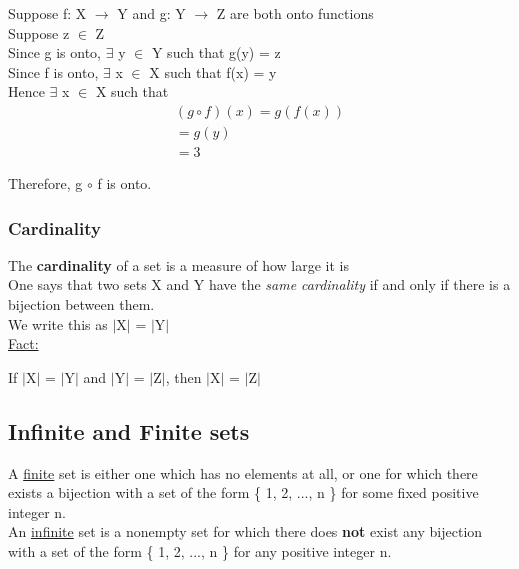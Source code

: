 \documentclass{article}
\begin{document}
Suppose f: X $\longrightarrow$ Y and g: Y $\longrightarrow$ Z are both onto functions \\

Suppose z $\in$ Z \\

Since g is onto, $\exists$ y $\in$ Y such that g(y) = z \\

Since f is onto, $\exists$ x $\in$ X such that f(x) = y \\

Hence $\exists$ x $\in$ X such that 
\begin{align}
(g \circ f)(x) = g(f(x)) \\
= g(y) \\
= 3
\end{align}

Therefore, g $\circ$ f is onto. \\

\subsubsection{Cardinality}

The \textbf{cardinality} of a set is a measure of how large it is \\

One says that two sets X and Y have the \textit{same cardinality} if and only if there is a bijection between them. \\
We write this as $|$X$|$ = $|$Y$|$ \\

\underline{Fact:}

If $|$X$|$ = $|$Y$|$ and $|$Y$|$ = $|$Z$|$, then $|$X$|$ = $|$Z$|$ \\

\subsection{Infinite and Finite sets}

A \underline{finite} set is either one which has no elements at all, or one for which there exists a bijection with a set of the form \{ 1, 2, ..., n \} for some fixed positive integer n. \\

An \underline{infinite} set is a nonempty set for which there does \textbf{not} exist any bijection with a set of the form \{ 1, 2, ..., n \} for any positive integer n. \\
\end{document}
